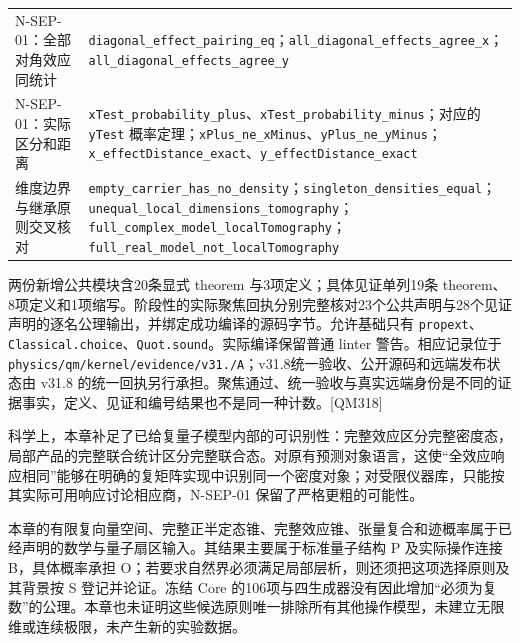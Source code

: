 \documentclass[
  11pt,
  oneside]{book}
\begin{document}
\begin{longtable}[]{@{}
  >{\raggedright\arraybackslash}p{}
  >{\raggedright\arraybackslash}p{}@{}}
N-SEP-01：全部对角效应同统计 &
\texttt{diagonal\_\allowbreak effect\_\allowbreak pairing\_\allowbreak eq}；\texttt{all\_\allowbreak diagonal\_\allowbreak effects\_\allowbreak agree\_\allowbreak x}；\texttt{all\_\allowbreak diagonal\_\allowbreak effects\_\allowbreak agree\_\allowbreak y} \\
N-SEP-01：实际区分和距离 &
\texttt{x\allowbreak Test\_\allowbreak probability\_\allowbreak plus}、\allowbreak \texttt{x\allowbreak Test\_\allowbreak probability\_\allowbreak minus}；对应的
\texttt{y\allowbreak Test}
概率定理；\texttt{x\allowbreak Plus\_\allowbreak ne\_\allowbreak x\allowbreak Minus}、\allowbreak \texttt{y\allowbreak Plus\_\allowbreak ne\_\allowbreak y\allowbreak Minus}；\texttt{x\_\allowbreak effect\allowbreak Distance\_\allowbreak exact}、\allowbreak \texttt{y\_\allowbreak effect\allowbreak Distance\_\allowbreak exact} \\
维度边界与继承原则交叉核对 &
\texttt{empty\_\allowbreak carrier\_\allowbreak has\_\allowbreak no\_\allowbreak density}；\texttt{singleton\_\allowbreak densities\_\allowbreak equal}；\texttt{unequal\_\allowbreak local\_\allowbreak dimensions\_\allowbreak tomography}；\texttt{full\_\allowbreak complex\_\allowbreak model\_\allowbreak local\allowbreak Tomography}；\texttt{full\_\allowbreak real\_\allowbreak model\_\allowbreak not\_\allowbreak local\allowbreak Tomography} \\
\end{longtable}

两份新增公共模块含20条显式 theorem 与3项定义；具体见证单列19条
theorem、8项定义和1项缩写。阶段性的实际聚焦回执分别完整核对23个公共声明与28个见证声明的逐名公理输出，并绑定成功编译的源码字节。允许基础只有
\texttt{propext}、\allowbreak \texttt{Classical.\allowbreak choice}、\allowbreak \texttt{Quot.\allowbreak sound}。实际编译保留普通
linter 警告。相应记录位于
\texttt{physics/\allowbreak qm/\allowbreak kernel/\allowbreak evidence/\allowbreak v31./\allowbreak A}；v31.8统一验收、公开源码和远端发布状态由
v31.8
的统一回执另行承担。聚焦通过、统一验收与真实远端身份是不同的证据事实，定义、见证和编号结果也不是同一种计数。{[}QM318{]}

科学上，本章补足了已给复量子模型内部的可识别性：完整效应区分完整密度态，局部产品的完整联合统计区分完整联合态。对原有预测对象语言，这使``全效应响应相同''能够在明确的复矩阵实现中识别同一个密度对象；对受限仪器库，只能按其实际可用响应讨论相应商，N-SEP-01
保留了严格更粗的可能性。

本章的有限复向量空间、完整正半定态锥、完整效应锥、张量复合和迹概率属于已经声明的数学与量子扇区输入。其结果主要属于标准量子结构
P 及实际操作连接 B，具体概率承担
O；若要求自然界必须满足局部层析，则还须把这项选择原则及其背景按 S
登记并论证。冻结 Core
的106项与四生成器没有因此增加``必须为复数''的公理。本章也未证明这些候选原则唯一排除所有其他操作模型，未建立无限维或连续极限，未产生新的实验数据。
\end{document}
